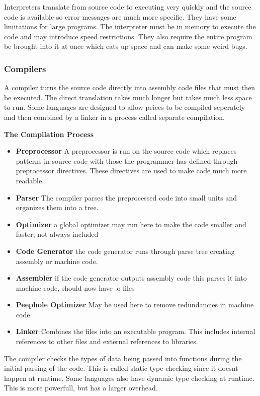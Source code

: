 \documentclass[12pt]{article}
\begin{document}
Interpreters translate from source code to executing very quickly and the source code is available so error messages are much more specific. They have some limitations for large programs. The interpreter must be in memory to execute the code and may introduce speed restrictions. They also require the entire program be brought into it at once which eats up space and can make some weird bugs.

\subsubsection*{Compilers}
A compiler turns the source code directly into assembly code files that must then be executed. The direct translation takes much longer but takes much less space to run. Some languages are designed to allow peices to be compiled seperately and then combined by a linker in a process called separate compilation.

\textbf{The Compilation Process}
\begin{itemize}
    \item \textbf{Preprocessor} A preprocessor is run on the source code which replaces patterns in source code with those the programmer has defined through preprocessor directives. These directives are used to make code much more readable.
    \item \textbf{Parser} The compiler parses the preprocessed code into small units and organizes them into a tree.
    \item \textbf{Optimizer} a global optimizer may run here to make the code smaller and faster, not always included
    \item \textbf{Code Generator} the code generator runs through parse tree creating assembly or machine code.
    \item \textbf{Assembler} if the code generator outputs assembly code this parses it into machine code, should now have .o files
    \item \textbf{Peephole Optimizer} May be used here to remove redundancies in machine code
    \item \textbf{Linker} Combines the files into an executable program. This includes internal references to other files and external references to libraries.
\end{itemize}

The compiler checks the types of data being passed into functions during the initial parsing of the code. This is called static type checking since it doesnt happen at runtime. Some languages also have dynamic type checking at runtime. This is more powerfull, but has a larger overhead.
\end{document}
